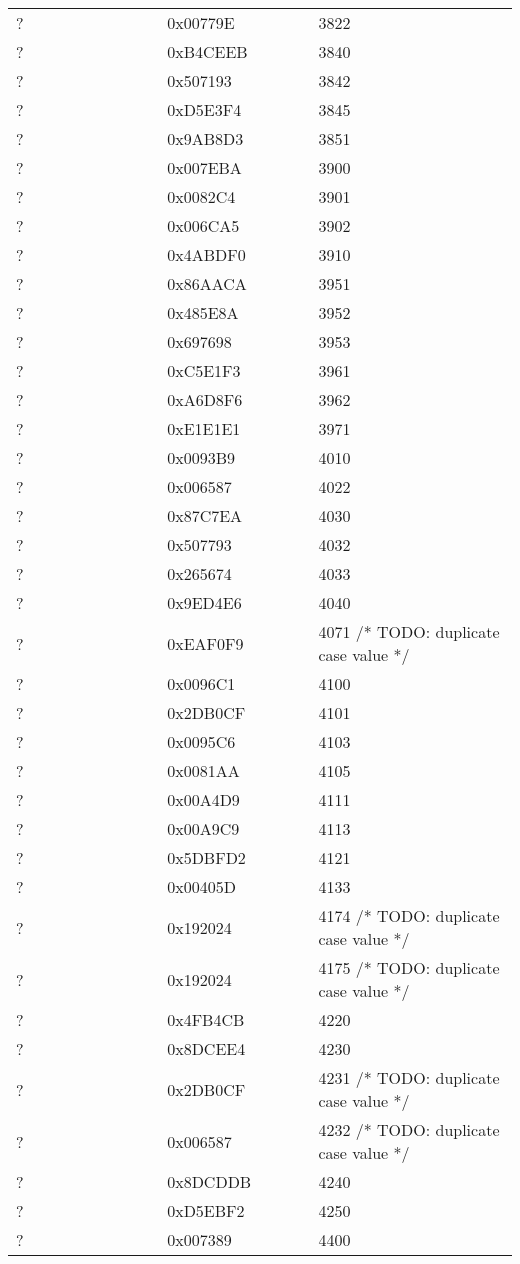 \begin{longtable}{p{0.3\linewidth} p{0.3\linewidth} p{0.4\linewidth}}
? &  0x00779E &  3822\\
? &  0xB4CEEB &  3840\\
? &  0x507193 &  3842\\
? &  0xD5E3F4 &  3845\\
? &  0x9AB8D3 &  3851\\
? &  0x007EBA &  3900\\
? &  0x0082C4 &  3901\\
? &  0x006CA5 &  3902\\
? &  0x4ABDF0 &  3910\\
? &  0x86AACA &  3951\\
? &  0x485E8A &  3952\\
? &  0x697698 &  3953\\
? &  0xC5E1F3 &  3961\\
? &  0xA6D8F6 &  3962\\
? &  0xE1E1E1 &  3971\\
? &  0x0093B9 &  4010\\
? &  0x006587 &  4022\\
? &  0x87C7EA &  4030\\
? &  0x507793 &  4032\\
? &  0x265674 &  4033\\
? &  0x9ED4E6 &  4040\\
? &  0xEAF0F9 &  4071 /* TODO: duplicate case value */\\
? &  0x0096C1 &  4100\\
? &  0x2DB0CF &  4101\\
? &  0x0095C6 &  4103\\
? &  0x0081AA &  4105\\
? &  0x00A4D9 &  4111\\
? &  0x00A9C9 &  4113\\
? &  0x5DBFD2 &  4121\\
? &  0x00405D &  4133\\
? &  0x192024 &  4174 /* TODO: duplicate case value */\\
? &  0x192024 &  4175 /* TODO: duplicate case value */\\
? &  0x4FB4CB &  4220\\
? &  0x8DCEE4 &  4230\\
? &  0x2DB0CF &  4231 /* TODO: duplicate case value */\\
? &  0x006587 &  4232 /* TODO: duplicate case value */\\
? &  0x8DCDDB &  4240\\
? &  0xD5EBF2 &  4250\\
? &  0x007389 &  4400\\

\end{longtable}
